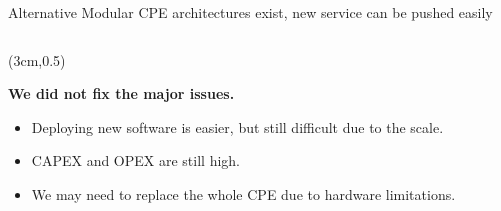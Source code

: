 \documentclass[a4paper]{beamer}
\begin{document}
\begin{frame}{Alternative Modular CPE architectures exist, new service can be pushed easily}
\begin{columns}[T]
\begin{column}[T]{0.70 \textwidth}
																																							
		\end{column}
																										
	\end{columns}
							
								
								
							
	\begin{textblock*}{7cm}(3cm,0.5\textheight)
		\begin{alertblock}{}
			\textbf{  We did not fix the major issues. }
			\begin{itemize}
				\item Deploying new software is easier, but still difficult due to the scale.
				\item CAPEX and OPEX are still high.
				\item We may need to replace the whole CPE due to hardware limitations.
			\end{itemize}
		\end{alertblock}
	\end{textblock*}			
											
									
										
\end{frame}
\end{document}
